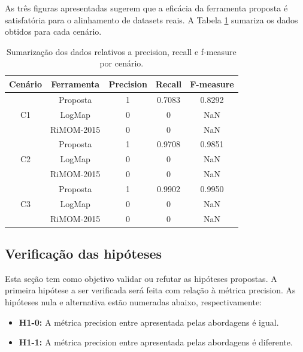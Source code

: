 As três figuras apresentadas sugerem que a eficácia da ferramenta proposta é satisfatória para o alinhamento de datasets reais. A Tabela \ref{tab:resultados} sumariza os dados obtidos para cada cenário.

\begin{table}[h]
\centering
\caption{Sumarização dos dados relativos a precision, recall e f-measure por cenário.}
\label{tab:resultados}
\begin{tabular}{|c|c|c|c|c|}
\hline
Cenário             & Ferramenta & Precision & Recall & F-measure \\ \hline
\multirow{3}{*}{C1} & Proposta   & 1         & 0.7083 & 0.8292    \\ \cline{2-5} 
                    & LogMap     & 0         & 0      & NaN       \\ \cline{2-5} 
                    & RiMOM-2015 & 0         & 0      & NaN       \\ \hline
\multirow{3}{*}{C2} & Proposta   & 1         & 0.9708 & 0.9851    \\ \cline{2-5} 
                    & LogMap     & 0         & 0      & NaN       \\ \cline{2-5} 
                    & RiMOM-2015 & 0         & 0      & NaN       \\ \hline
\multirow{3}{*}{C3} & Proposta   & 1         & 0.9902 & 0.9950    \\ \cline{2-5} 
                    & LogMap     & 0         & 0      & NaN       \\ \cline{2-5} 
                    & RiMOM-2015 & 0         & 0      & NaN       \\ \hline
\end{tabular}
\end{table}

\subsection{Verificação das hipóteses}
Esta seção tem como objetivo validar ou refutar as hipóteses propostas. A primeira hipótese a ser verificada será feita com relação à métrica precision. As hipóteses nula e alternativa estão numeradas abaixo, respectivamente:

\begin{itemize}
\item \textbf{H1-0:} A métrica precision entre apresentada pelas abordagens é igual.
\item \textbf{H1-1:} A métrica precision entre apresentada pelas abordagens é diferente.
\end{itemize}

